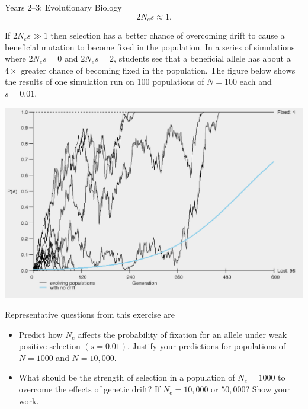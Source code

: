 \documentclass[final,hyperref={pdfpagelabels=false}]{beamer}
\newcommand{\whitespace}{\vspace{0.5\baselineskip}}
\newlength{\onecolwid}
\begin{document}
\begin{frame}[t]
\begin{columns}[t]
\begin{column}{\onecolwid}
\begin{block}{Years 2–3: Evolutionary Biology}
       		\begin{equation*}
       		2N_es \approx 1.
       		\end{equation*}
       		
       		If $2N_es \gg 1$ then selection has a better chance of overcoming drift to cause a beneficial mutation to become fixed in the population. In a series of simulations where $2N_es = 0$ and $2N_es = 2$, students see that a beneficial allele has about a $4\times$ greater chance of becoming fixed in the population. The figure below shows the results of one simulation run on 100 populations of $N = 100$ each and $s = 0.01$.
       		
			\whitespace

			\includegraphics[width=\textwidth]{ns_graph}

			\whitespace
       		
       		Representative questions from this exercise are
       		\begin{itemize}\justifying
       			
       			\item Predict how $N_e$ affects the probability of fixation for an allele under weak positive selection $\left(s = 0.01\right)$. Justify your predictions for populations of $N = 1000$ and $N = 10,000$.
       			
       			
       			\item What should be the strength of selection in a population of $N_e = 1000$ to overcome the effects of genetic drift? If $N_e = 10,000$ or $50,000$? Show your work.
       		\end{itemize}
       		

\end{block}
\end{column}
\end{columns}
\end{frame}
\end{document}
